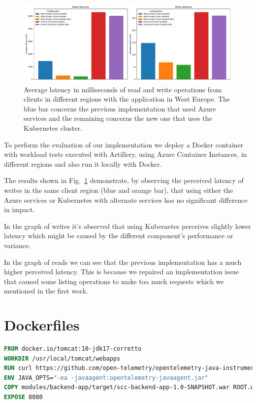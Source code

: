 \documentclass[runningheads]{llncs}
\begin{document}
\begin{figure}
    \includegraphics[width=\textwidth]{latencies}
    \caption{Average latency in milliseconds of read and write operations from clients in different regions with the application in West Europe. The blue bar concerns the previous implementation that used Azure services and the remaining concerns the new one that uses the Kubernetes cluster.} \label{fig:latencies}
\end{figure}

To perform the evaluation of our implementation we deploy a Docker container with workload tests executed with Artillery, using Azure Container Instances, in different regions and also run it locally with Docker.

The results shown in Fig.~\ref{fig:latencies} demonstrate, by observing the perceived latency of writes in the same client region (blue and orange bar), that using either the Azure services or Kubernetes with alternate services has no significant difference in impact. 

In the graph of writes it's observed that using Kubernetes perceives slightly lower latency which might be caused by the different component's performance or variance.  

In the graph of reads we can see that the previous implementation has a much higher perceived latency. This is because we repaired an implementation issue that caused some listing operations to make too much requests which we mentioned in the first work.

\clearpage
\appendix
\section{Dockerfiles}

\begin{lstlisting}[language=Dockerfile, caption=backend.dockerfile]
FROM docker.io/tomcat:10-jdk17-corretto
WORKDIR /usr/local/tomcat/webapps
RUN curl https://github.com/open-telemetry/opentelemetry-java-instrumentation/releases/download/v1.20.2/opentelemetry-javaagent.jar -L --output opentelemetry-javaagent.jar
ENV JAVA_OPTS="-ea -javaagent:opentelemetry-javaagent.jar"
COPY modules/backend-app/target/scc-backend-app-1.0-SNAPSHOT.war ROOT.war
EXPOSE 8080
\end{lstlisting}
\end{document}
